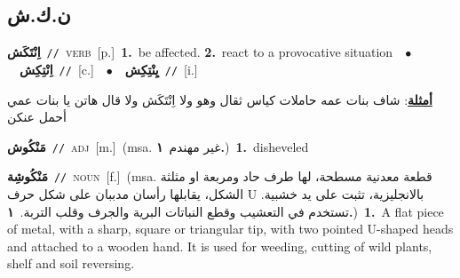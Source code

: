 \documentclass[10pt,a4paper,twoside]{article} %
\begin{document}
\begin{multicols}{2}
\vspace{-3mm}
\subsection*{\color{blue}\foreignlanguage{arabic}{ن.ك.ش}\color{blue}{}} 

{\setlength\topsep{0pt}\textbf{\foreignlanguage{arabic}{اِنْتَكَش}}\ {\color{gray}\texttt{//}\color{black}}\ \textsc{verb}\ [p.]\ \textbf{1.}~be affected.  \textbf{2.}~react to a provocative situation\ \ $\bullet$\ \ \setlength\topsep{0pt}\textbf{\foreignlanguage{arabic}{اِنْتِكِش}}\ {\color{gray}\texttt{//}\color{black}}\ [c.]\ \ $\bullet$\ \ \setlength\topsep{0pt}\textbf{\foreignlanguage{arabic}{يِنْتِكِش}}\ {\color{gray}\texttt{//}\color{black}}\ [i.]\  \begin{flushright}\color{gray}\foreignlanguage{arabic}{\textbf{\underline{\foreignlanguage{arabic}{أمثلة}}}: شاف بنات عمه حاملات كياس ثقال وهو ولا اِنْتَكَش ولا قال هاتن يا بنات عمي أحمل عنكن}\end{flushright}\color{black}} \vspace{2mm}

{\setlength\topsep{0pt}\textbf{\foreignlanguage{arabic}{مَنْكُوش}}\ {\color{gray}\texttt{//}\color{black}}\ \textsc{adj}\ [m.]\ \color{gray}(msa. \foreignlanguage{arabic}{غير مهندم}~\foreignlanguage{arabic}{\textbf{١.}})\color{black}\ \textbf{1.}~disheveled\ } \vspace{2mm}

{\setlength\topsep{0pt}\textbf{\foreignlanguage{arabic}{مَنْكُوشِة}}\ {\color{gray}\texttt{//}\color{black}}\ \textsc{noun}\ [f.]\ \color{gray}(msa. \foreignlanguage{arabic}{قطعة معدنية مسطحة، لها طرف حاد ومربعة او مثلثة الشكل، يقابلها رأسان مدببان على شكل حرف} U \foreignlanguage{arabic}{بالانجليزية، تثبت على يد خشبية. تستخدم في التعشيب وقطع النباتات البرية والجرف وقلب التربة.}~\foreignlanguage{arabic}{\textbf{١.}})\color{black}\ \textbf{1.}~A flat piece of metal, with a sharp, square or triangular tip, with two pointed U-shaped heads and attached to a wooden hand. It is used for weeding, cutting of wild plants, shelf and soil reversing.\ } \vspace{2mm}


\end{multicols}
\end{document}
